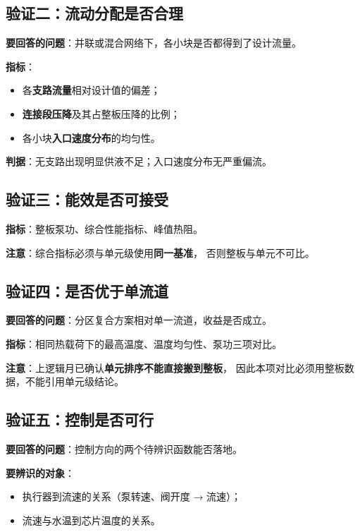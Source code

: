 \documentclass[stage2,fontset=fandol]{ydzjreport}
\begin{document}
\subsection{验证二：流动分配是否合理}

\textbf{要回答的问题}：并联或混合网络下，各小块是否都得到了设计流量。

\textbf{指标}：
\begin{itemize}
  \item 各\textbf{支路流量}相对设计值的偏差；
  \item \textbf{连接段压降}及其占整板压降的比例；
  \item 各小块\textbf{入口速度分布}的均匀性。
\end{itemize}

\textbf{判据}：无支路出现明显供液不足；入口速度分布无严重偏流。

\subsection{验证三：能效是否可接受}

\textbf{指标}：整板泵功、综合性能指标、峰值热阻。

\textbf{注意}：综合指标必须与单元级使用\textbf{同一基准}，
否则整板与单元不可比。

\subsection{验证四：是否优于单流道}

\textbf{要回答的问题}：分区复合方案相对单一流道，收益是否成立。

\textbf{指标}：相同热载荷下的最高温度、温度均匀性、泵功三项对比。

\textbf{注意}：上逻辑月已确认\textbf{单元排序不能直接搬到整板}，
因此本项对比必须用整板数据，不能引用单元级结论。

\subsection{验证五：控制是否可行}

\textbf{要回答的问题}：控制方向的两个待辨识函数能否落地。

\textbf{要辨识的对象}：
\begin{itemize}
  \item 执行器到流速的关系（泵转速、阀开度 → 流速）；
  \item 流速与水温到芯片温度的关系。
\end{itemize}
\end{document}
